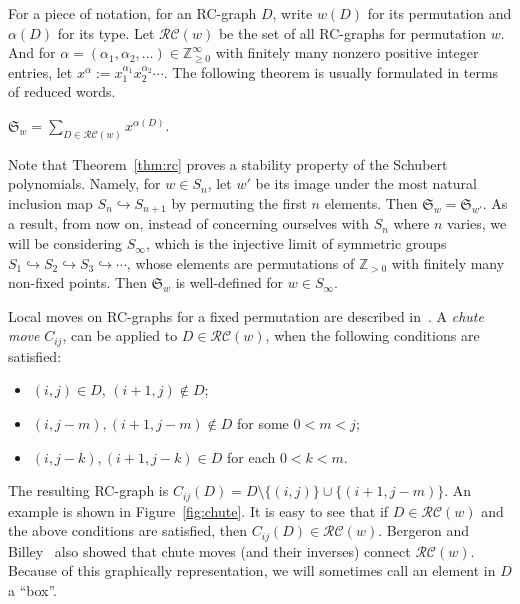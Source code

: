\documentclass[ALCO,ThmDefs,Unicode,epreuves]{cedram}
\newcommand{\Z}{\mathbb{Z}}
\newcommand{\RC}{\mathcal{RC}}
\begin{document}
For a piece of notation, for an RC-graph $D$, write $w(D)$ for its permutation and $\alpha(D)$ for its type. Let $\RC(w)$ be the set of all RC-graphs for permutation $w$. And for $\alpha=(\alpha_1,\alpha_2,\ldots)\in\Z_{\geq0}^{\infty}$ with finitely many nonzero positive integer entries, let $x^{\alpha}:=x_1^{\alpha_1}x_2^{\alpha_2}\cdots.$ The following theorem is usually formulated in terms of reduced words.
\begin{theorem}\label{thm:rc}
$\mathfrak{S}_w=\sum_{D\in\RC(w)}x^{\alpha(D)}.$
\end{theorem}
Note that Theorem~\ref{thm:rc} proves a stability property of the Schubert polynomials. Namely, for $w\in S_n$, let $w'$ be its image under the most natural inclusion map $S_n\hookrightarrow S_{n+1}$ by permuting the first $n$ elements. Then $\mathfrak{S}_w=\mathfrak{S}_{w'}$. As a result, from now on, instead of concerning ourselves with $S_n$ where $n$ varies, we will be considering $S_{\infty}$, which is the injective limit of symmetric groups $S_1\hookrightarrow S_2\hookrightarrow S_3\hookrightarrow\cdots$, whose elements are permutations of $\Z_{>0}$ with finitely many non-fixed points. Then $\mathfrak{S}_w$ is well-defined for $w\in S_{\infty}$. 

Local moves on RC-graphs for a fixed permutation are described in~\cite{bergeron1993rc}. A \emph{chute move} $C_{ij}$, can be applied to $D\in\RC(w)$, when the following conditions are satisfied:
\begin{itemize}
\item $(i,j)\in D$, $(i+1,j)\notin D$;
\item $(i,j-m),(i+1,j-m)\notin D$ for some $0<m<j$;
\item $(i,j-k),(i+1,j-k)\in D$ for each $0<k<m$.
\end{itemize}
The resulting RC-graph is $C_{ij}(D)=D\setminus\{(i,j)\}\cup\{(i+1,j-m)\}.$ An example is shown in Figure~\ref{fig:chute}. It is easy to see that if $D\in\RC(w)$ and the above conditions are satisfied, then $C_{ij}(D)\in\RC(w)$. Bergeron and Billey~\cite{bergeron1993rc} also showed that chute moves (and their inverses) connect $\RC(w)$. 
Because of this graphically representation, we will sometimes call an element in $D$ a ``box''. 
\end{document}
